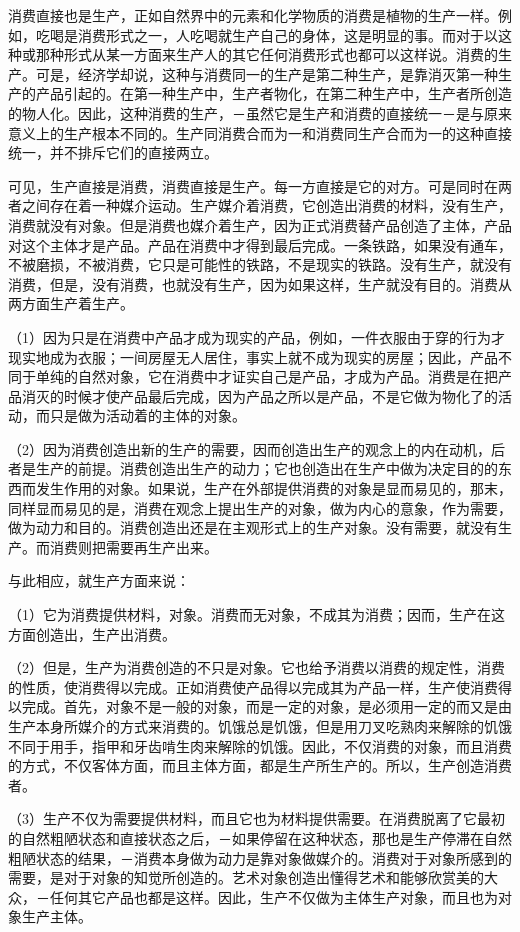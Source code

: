 \documentclass[a4paper,twoside,12pt,AutoFakeBold]{ctexart}
\begin{document}
消费直接也是生产，正如自然界中的元素和化学物质的消费是植物的生产一样。例如，吃喝是消费形式之一，人吃喝就生产自己的身体，这是明显的事。而对于以这种或那种形式从某一方面来生产人的其它任何消费形式也都可以这样说。消费的生产。可是，经济学却说，这种与消费同一的生产是第二种生产，是靠消灭第一种生产的产品引起的。在第一种生产中，生产者物化，在第二种生产中，生产者所创造的物人化。因此，这种消费的生产，－虽然它是生产和消费的直接统一－是与原来意义上的生产根本不同的。生产同消费合而为一和消费同生产合而为一的这种直接统一，并不排斥它们的直接两立。

可见，生产直接是消费，消费直接是生产。每一方直接是它的对方。可是同时在两者之间存在着一种媒介运动。生产媒介着消费，它创造出消费的材料，没有生产，消费就没有对象。但是消费也媒介着生产，因为正式消费替产品创造了主体，产品对这个主体才是产品。产品在消费中才得到最后完成。一条铁路，如果没有通车，不被磨损，不被消费，它只是可能性的铁路，不是现实的铁路。没有生产，就没有消费，但是，没有消费，也就没有生产，因为如果这样，生产就没有目的。消费从两方面生产着生产。

（1）因为只是在消费中产品才成为现实的产品，例如，一件衣服由于穿的行为才现实地成为衣服；一间房屋无人居住，事实上就不成为现实的房屋；因此，产品不同于单纯的自然对象，它在消费中才证实自己是产品，才成为产品。消费是在把产品消灭的时候才使产品最后完成，因为产品之所以是产品，不是它做为物化了的活动，而只是做为活动着的主体的对象。

（2）因为消费创造出新的生产的需要，因而创造出生产的观念上的内在动机，后者是生产的前提。消费创造出生产的动力；它也创造出在生产中做为决定目的的东西而发生作用的对象。如果说，生产在外部提供消费的对象是显而易见的，那末，同样显而易见的是，消费在观念上提出生产的对象，做为内心的意象，作为需要，做为动力和目的。消费创造出还是在主观形式上的生产对象。没有需要，就没有生产。而消费则把需要再生产出来。

与此相应，就生产方面来说：

（1）它为消费提供材料，对象。消费而无对象，不成其为消费；因而，生产在这方面创造出，生产出消费。

（2）但是，生产为消费创造的不只是对象。它也给予消费以消费的规定性，消费的性质，使消费得以完成。正如消费使产品得以完成其为产品一样，生产使消费得以完成。首先，对象不是一般的对象，而是一定的对象，是必须用一定的而又是由生产本身所媒介的方式来消费的。饥饿总是饥饿，但是用刀叉吃熟肉来解除的饥饿不同于用手，指甲和牙齿啃生肉来解除的饥饿。因此，不仅消费的对象，而且消费的方式，不仅客体方面，而且主体方面，都是生产所生产的。所以，生产创造消费者。

（3）生产不仅为需要提供材料，而且它也为材料提供需要。在消费脱离了它最初的自然粗陋状态和直接状态之后，－如果停留在这种状态，那也是生产停滞在自然粗陋状态的结果，－消费本身做为动力是靠对象做媒介的。消费对于对象所感到的需要，是对于对象的知觉所创造的。艺术对象创造出懂得艺术和能够欣赏美的大众，－任何其它产品也都是这样。因此，生产不仅做为主体生产对象，而且也为对象生产主体。
\end{document}

